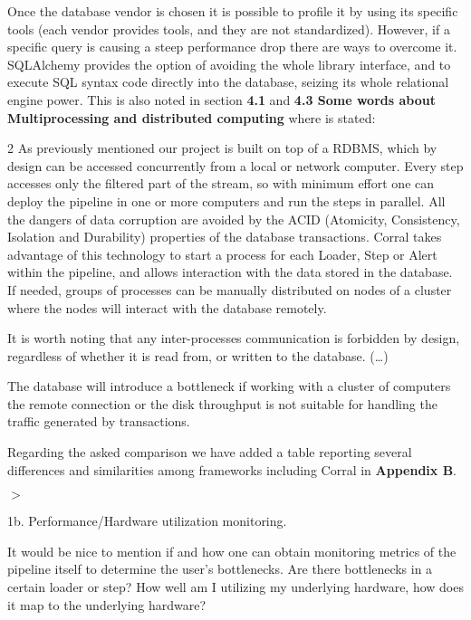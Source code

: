 \documentclass[a4paper,onecolumn,fleqn,usenatbib,useAMS]{mnrasr}
\newenvironment{frshaded}{%
\def\FrameCommand{\fboxrule=\FrameRule\fboxsep=\FrameSep \fcolorbox{framecolor}{shadecolor}}%
\MakeFramed {\FrameRestore}}%
{\endMakeFramed}
\newenvironment{myindentpar}[1]%
 {\begin{list}{}%
         \bigskip
         \color{refereecolor}
         {\setlength{\leftmargin}{#1}}%
         \itshape
         \item[$>$]%
 }
 {\end{list}}
\begin{document}
Once the database vendor is chosen it is possible to profile it by using 
its specific tools (each vendor provides tools, and they are not standardized).
%
However, if a specific query is causing a steep performance drop there
are ways to overcome it.
%
SQLAlchemy provides the option of avoiding the whole library interface, and
to execute SQL syntax code directly into the database, seizing its whole
relational engine power. This is also noted in section \textbf{4.1}
and \textbf{4.3 Some words about Multiprocessing and distributed computing}
where is stated:
\begin{frshaded}
\begin{multicols}{2} 
As previously mentioned our project is built on top of a RDBMS, which by design 
can be accessed concurrently from a local or network computer. 
%
Every step accesses only the filtered part of the stream, 
so with minimum effort one can deploy the pipeline in one or more
computers and run the steps in parallel. 
%
All the dangers of data corruption are avoided
by the ACID (Atomicity, Consistency, Isolation and Durability) 
properties of the database transactions.
%
Corral takes advantage of this technology to start a process for each Loader,
Step or Alert within the pipeline, and allows interaction with the data stored in the database.
%
If needed, groups of processes can be manually distributed on nodes of a
cluster where the nodes will interact with the database remotely.

It is worth noting that any inter-processes communication is forbidden by design,
regardless of whether it is read from, or written to the database.
%
(\ldots)

\end{multicols} \end{frshaded} 

The database will introduce a bottleneck if working with a cluster of computers
the remote connection or the disk throughput is not suitable for handling 
the traffic generated by transactions. 

Regarding the asked comparison we have added
a table reporting several differences and similarities
among frameworks including Corral in \textbf{Appendix B}.

\begin{myindentpar}{1cm}
1b. Performance/Hardware utilization monitoring.

It would be nice to mention if and how one can obtain monitoring
metrics of the pipeline itself to determine the user's bottlenecks.
Are there bottlenecks in a certain loader or step? How well am I
utilizing my underlying hardware, how does it map to the underlying
hardware?
 
\end{myindentpar}
\end{document}
